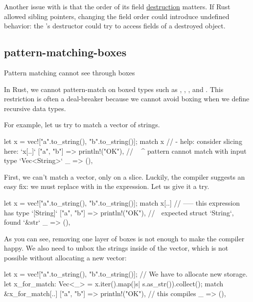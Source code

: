 \documentclass{article}
\begin{document}
Another issue with  is that the order of its field \href{https://doc.rust-lang.org/stable/reference/destructors.html}{destruction} matters.
If Rust allowed sibling pointers, changing the field order could introduce undefined behavior: the 's destructor could try to access fields of a destroyed  object.

\subsection{pattern-matching-boxes}{Pattern matching cannot see through boxes}

In Rust, we cannot pattern-match on boxed types such as , , , and .
This restriction is often a deal-breaker because we cannot avoid boxing when we define recursive data types.

For example, let us try to match a vector of strings.

\begin{code}[bad]
let x = vec!["a".to_string(), "b".to_string()];
match x {
//    - help: consider slicing here: `x[..]`
    ["a", "b"] => println!("OK"),
//  ^^^^^^^^^^ pattern cannot match with input type `Vec<String>`
    _ => (),
}
\end{code}

First, we can't match a vector, only on a slice.
Luckily, the compiler suggests an easy fix: we must replace  with  in the  expression.
Let us give it a try.

\begin{code}[bad]
let x = vec!["a".to_string(), "b".to_string()];
match x[..] {
//    ----- this expression has type `[String]`
    ["a", "b"] => println!("OK"),
//   ^^^ expected struct `String`, found `&str`
    _ => (),
}
\end{code}

As you can see, removing one layer of boxes is not enough to make the compiler happy.
We also need to unbox the strings inside of the vector, which is not possible without allocating a new vector:

\begin{code}[good]
let x = vec!["a".to_string(), "b".to_string()];
// We have to allocate new storage.
let x_for_match: Vec<_> = x.iter().map(|s| s.as_str()).collect();
match &x_for_match[..] {
    ["a", "b"] => println!("OK"), // this compiles
    _ => (),
}
\end{code}
\end{document}
